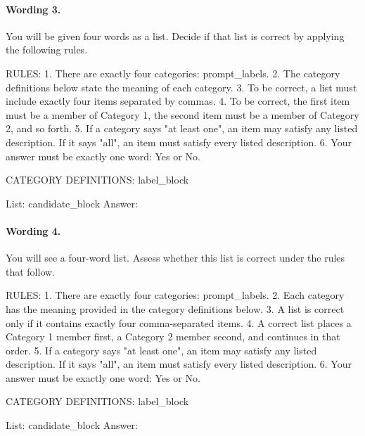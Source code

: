 \paragraph{Wording 3.}
\begin{promptbox}
You will be given four words as a list. Decide if that list is correct by applying the following rules.

RULES:
1. There are exactly four categories: {prompt_labels}.
2. The category definitions below state the meaning of each category.
3. To be correct, a list must include exactly four items separated by commas.
4. To be correct, the first item must be a member of Category 1, the second item must be a member of Category 2, and so forth.
5. If a category says "at least one", an item may satisfy any listed description. If it says "all", an item must satisfy every listed description.
6. Your answer must be exactly one word: Yes or No.

CATEGORY DEFINITIONS:
{label_block}

List: {candidate_block}
Answer:
\end{promptbox}

\paragraph{Wording 4.}
\begin{promptbox}
You will see a four-word list. Assess whether this list is correct under the rules that follow.

RULES:
1. There are exactly four categories: {prompt_labels}.
2. Each category has the meaning provided in the category definitions below.
3. A list is correct only if it contains exactly four comma-separated items.
4. A correct list places a Category 1 member first, a Category 2 member second, and continues in that order.
5. If a category says "at least one", an item may satisfy any listed description. If it says "all", an item must satisfy every listed description.
6. Your answer must be exactly one word: Yes or No.

CATEGORY DEFINITIONS:
{label_block}

List: {candidate_block}
Answer:
\end{promptbox}

